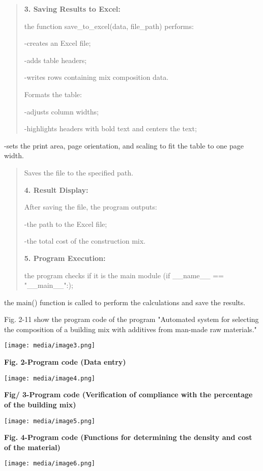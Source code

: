 \documentclass[
]{article}
\begin{document}
\begin{quote}
\textbf{3. Saving Results to Excel:}

the function save\_to\_excel(data, file\_path) performs:

-creates an Excel file;

-adds table headers;

-writes rows containing mix composition data.

Formats the table:

-adjusts column widths;

-highlights headers with bold text and centers the text;
\end{quote}

-sets the print area, page orientation, and scaling to fit the table to
one page width.

\begin{quote}
Saves the file to the specified path.

\textbf{4. Result Display:}

After saving the file, the program outputs:

-the path to the Excel file;

-the total cost of the construction mix.

\textbf{5. Program Execution:}

the program checks if it is the main module (if \_\_name\_\_ ==
"\_\_main\_\_":);
\end{quote}

the main() function is called to perform the calculations and save the
results.

Fig. 2-11 show the program code of the program "Automated system for
selecting the composition of a building mix with additives from man-made
raw materials."

\texttt{[image: media/image3.png]}

\textbf{Fig. 2-Program code (Data entry)}

\texttt{[image: media/image4.png]}

\textbf{Fig/ 3-Program code (Verification of compliance with the
percentage of the building mix)}

\texttt{[image: media/image5.png]}

\textbf{Fig. 4-Program code (Functions for determining the density and
cost of the material)}

\texttt{[image: media/image6.png]}
\end{document}
